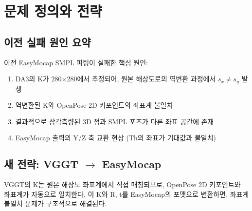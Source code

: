 \documentclass[11pt, a4paper]{report}
\begin{document}
\tableofcontents
\newpage


\chapter{문제 정의와 전략}

\section{이전 실패 원인 요약}

\begin{warningbox}
이전 EasyMocap SMPL 피팅이 실패한 핵심 원인:
\begin{enumerate}[leftmargin=*]
  \item DA3의 K가 280$\times$280에서 추정되어, 원본 해상도로의 역변환 과정에서 $s_x \neq s_y$ 발생
  \item 역변환된 K와 OpenPose 2D 키포인트의 좌표계 불일치
  \item 결과적으로 삼각측량된 3D 점과 SMPL 포즈가 다른 좌표 공간에 존재
  \item EasyMocap 출력의 Y/Z 축 교환 현상 (Th의 좌표가 기대값과 불일치)
\end{enumerate}
\end{warningbox}

\section{새 전략: VGGT $\rightarrow$ EasyMocap}

\begin{keyidea}
VGGT의 K는 원본 해상도 좌표계에서 직접 매칭되므로, OpenPose 2D 키포인트와 좌표계가 자동으로 일치한다. 이 K와 R, t를 EasyMocap의 포맷으로 변환하면, 좌표계 불일치 문제가 구조적으로 해결된다.
\end{keyidea}
\end{document}
